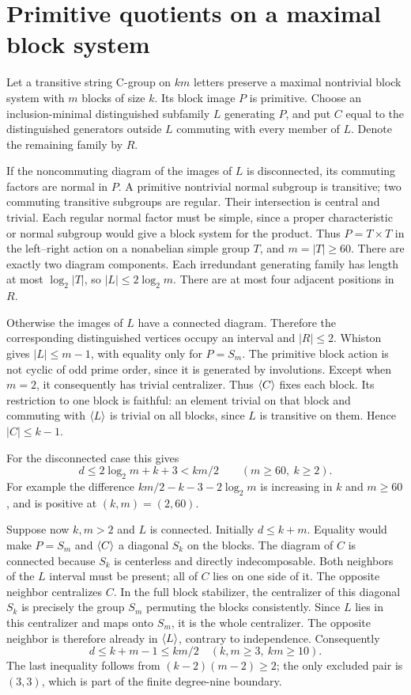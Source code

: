 \section{Primitive quotients on a maximal block system}
Let a transitive string C-group on $km$ letters preserve a maximal
nontrivial block system with $m$ blocks of size $k$. Its block image
$P$ is primitive. Choose an inclusion-minimal distinguished subfamily
$L$ generating $P$, and put $C$ equal to the distinguished generators
outside $L$ commuting with every member of $L$. Denote the remaining
family by $R$.

If the noncommuting diagram of the images of $L$ is disconnected,
its commuting factors are normal in $P$. A primitive nontrivial normal
subgroup is transitive; two commuting transitive subgroups are regular.
Their intersection is central and trivial. Each regular normal factor
must be simple, since a proper characteristic or normal subgroup
would give a block system for the product. Thus $P=T\times T$ in the
left--right action on a nonabelian simple group $T$, and $m=|T|\geq60$.
There are exactly two diagram components. Each irredundant generating
family has length at most $\log_2|T|$, so $|L|\leq2\log_2m$.
There are at most four adjacent positions in $R$.

Otherwise the images of $L$ have a connected diagram. Therefore the
corresponding distinguished vertices occupy an interval and $|R|\leq2$.
Whiston gives $|L|\leq m-1$, with equality only for $P=S_m$.
The primitive block action is not cyclic of odd prime order, since
it is generated by involutions. Except when $m=2$, it consequently
has trivial centralizer. Thus $\langle C\rangle$ fixes each block. Its restriction
to one block is faithful: an element trivial on that block and commuting
with $\langle L\rangle$ is trivial on all blocks, since $L$ is transitive on them.
Hence $|C|\leq k-1$.

For the disconnected case this gives
\[
 d\leq2\log_2m+k+3<km/2\qquad(m\geq60,\ k\geq2).
\]
For example the difference $km/2-k-3-2\log_2m$ is increasing in $k$
and $m\geq60$, and is positive at $(k,m)=(2,60)$.

Suppose now $k,m>2$ and $L$ is connected. Initially $d\leq k+m$.
Equality would make $P=S_m$ and $\langle C\rangle$ a diagonal $S_k$ on the blocks.
The diagram of $C$ is connected because $S_k$ is centerless and directly
indecomposable. Both neighbors of the $L$ interval must be present;
all of $C$ lies on one side of it. The opposite neighbor centralizes
$C$. In the full block stabilizer, the centralizer of this diagonal
$S_k$ is precisely the group $S_m$ permuting the blocks consistently.
Since $L$ lies in this centralizer and maps onto $S_m$, it is the whole
centralizer. The opposite neighbor is therefore already in $\langle L\rangle$,
contrary to independence. Consequently
\[
 d\leq k+m-1\leq km/2\quad(k,m\geq3,\ km\geq10).
\]
The last inequality follows from $(k-2)(m-2)\geq2$; the only excluded
pair is $(3,3)$, which is part of the finite degree-nine boundary.

